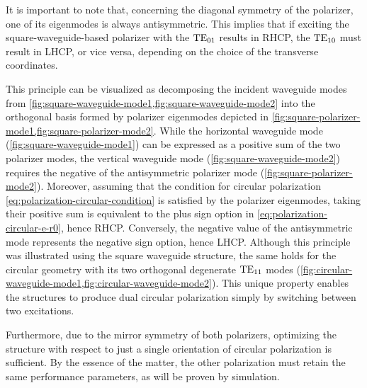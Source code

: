 \documentclass[14pt,a4paper]{ntust_report}
\begin{document}
\begin{remark}
    \label{remark:dual-polarization-capatibility}
    It is important to note that, concerning the diagonal symmetry of the polarizer, one of its eigenmodes is always antisymmetric. This implies that if exciting the square-waveguide-based polarizer with the $\text{TE}_{01}$ results in RHCP, the $\text{TE}_{10}$ must result in LHCP, or vice versa, depending on the choice of the transverse coordinates.
    
    This principle can be visualized as decomposing the incident waveguide modes from \cref{fig:square-waveguide-mode1,fig:square-waveguide-mode2} into the orthogonal basis formed by polarizer eigenmodes depicted in \cref{fig:square-polarizer-mode1,fig:square-polarizer-mode2}. While the horizontal waveguide mode (\cref{fig:square-waveguide-mode1}) can be expressed as a positive sum of the two polarizer modes, the vertical waveguide mode (\cref{fig:square-waveguide-mode2}) requires the negative of the antisymmetric polarizer mode (\cref{fig:square-polarizer-mode2}). Moreover, assuming that the condition for circular polarization \eqref{eq:polarization-circular-condition} is satisfied by the polarizer eigenmodes, taking their positive sum is equivalent to the plus sign option in \cref{eq:polarization-circular-e-r0}, hence RHCP. Conversely, the negative value of the antisymmetric mode represents the negative sign option, hence LHCP. Although this principle was illustrated using the square waveguide structure, the same holds for the circular geometry with its two orthogonal degenerate $\text{TE}_{11}$ modes (\cref{fig:circular-waveguide-mode1,fig:circular-waveguide-mode2}). This unique property enables the structures to produce dual circular polarization simply by switching between two excitations.

    Furthermore, due to the mirror symmetry of both polarizers, optimizing the structure with respect to just a single orientation of circular polarization is sufficient. By the essence of the matter, the other polarization must retain the same performance parameters, as will be proven by simulation.
\end{remark}
\end{document}

